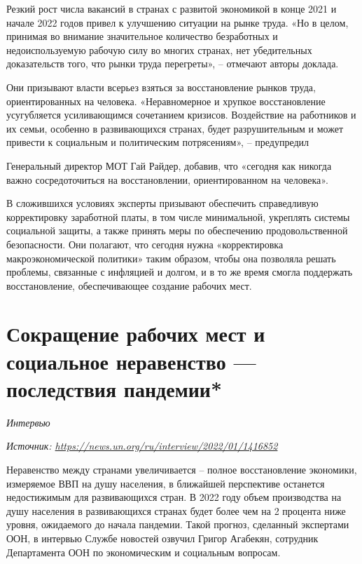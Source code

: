 Резкий рост числа вакансий в странах с развитой экономикой в конце 2021 и начале 2022 годов привел к улучшению ситуации на рынке труда. «Но в целом, принимая во внимание значительное количество безработных и недоиспользуемую рабочую силу во многих странах, нет убедительных доказательств того, что рынки труда перегреты», – отмечают авторы доклада.

Они призывают власти всерьез взяться за восстановление рынков труда, ориентированных на человека. «Неравномерное и хрупкое восстановление усугубляется усиливающимся сочетанием кризисов. Воздействие на работников и их семьи, особенно в развивающихся странах, будет разрушительным и может привести к социальным и политическим потрясениям», – предупредил

Генеральный директор МОТ Гай Райдер, добавив, что «сегодня как никогда важно сосредоточиться на восстановлении, ориентированном на человека».

В сложившихся условиях эксперты призывают обеспечить справедливую корректировку заработной платы, в том числе минимальной, укреплять системы социальной защиты, а также принять меры по обеспечению продовольственной безопасности.
Они полагают, что сегодня нужна «корректировка макроэкономической политики» таким образом, чтобы она позволяла решать проблемы, связанные с инфляцией и долгом, и в то же время смогла поддержать восстановление, обеспечивающее создание рабочих мест.


\newpage
\section[Сокращение рабочих мест]{Сокращение рабочих мест и социальное неравенство --- последствия пандемии*}

\textit{Интервью}

\textit{Источник: \url{https://news.un.org/ru/interview/2022/01/1416852}}


\begin{fancyquotes}
    Неравенство между странами увеличивается – полное восстановление экономики, измеряемое ВВП на душу населения, в ближайшей перспективе останется недостижимым для развивающихся стран. В 2022 году объем производства на душу населения в развивающихся странах будет более чем на 2 процента ниже уровня, ожидаемого до начала пандемии. Такой прогноз, сделанный экспертами ООН, в интервью Службе новостей озвучил Григор Агабекян, сотрудник Департамента ООН по экономическим и социальным вопросам.
\end{fancyquotes}

